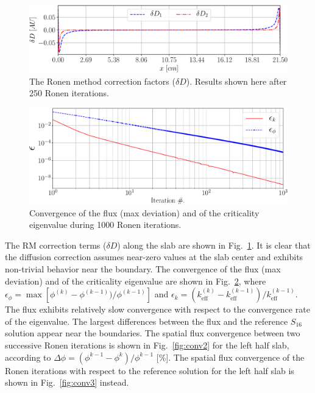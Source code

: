 \begin{figure}[htbp]
	\centering
	\includegraphics[width=0.65\linewidth]{dD_Tomatis2011_400_250it.pdf}
	\caption{The Ronen method correction factors ($\delta D$). Results shown here after 250 Ronen iterations.}
	\label{fig:slab-RM-corr-factor}
\end{figure}



\begin{figure}[htbp]
	\centering
	\includegraphics[width=0.65\linewidth]{epsilon1000.pdf}	
	\caption{Convergence of the flux (max deviation) and of the criticality
		eigenvalue during 1000 Ronen iterations.}
	\label{fig:conv}
\end{figure}

The RM correction terms ($\delta D$) along the slab are shown in Fig.~\ref{fig:slab-RM-corr-factor}. It is clear that the diffusion correction assumes near-zero values at the slab center and exhibits non-trivial behavior near the boundary. The convergence of the flux (max deviation) and of the criticality eigenvalue are shown in Fig.~\ref{fig:conv}, where $\epsilon_\phi = \operatorname{max} [\phi^{(k)}-\phi^{(k-1)})/\phi^{(k-1)}]$ and $\epsilon_k = (k_\textrm{eff}^{(k)}-k_\textrm{eff}^{(k-1)})/k_\textrm{eff}^{(k-1)}$. The flux exhibits relatively slow convergence with respect to the convergence rate of the eigenvalue. The largest differences between the flux and the reference $S_{16}$ solution appear near the boundaries. The spatial flux convergence between two successive Ronen iterations is shown in Fig.~\ref{fig:conv2} for the left half slab, according to $\Delta \phi = (\phi^{k-1}-\phi^k)/\phi^{k-1}$ [\%]. The spatial flux convergence of the Ronen iterations with respect to the reference solution for the left half slab is shown in Fig.~\ref{fig:conv3} instead.


